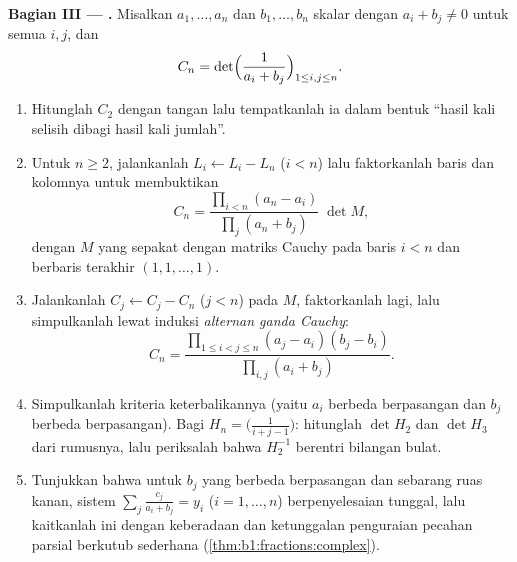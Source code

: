 \begin{problem}
\medskip
\noindent\textbf{Bagian III --- .} Misalkan $a_1,
\dots, a_n$ dan $b_1, \dots, b_n$ skalar dengan $a_i + b_j
\neq 0$ untuk semua $i, j$, dan
\[
C_n = \det\Bigl(\frac{1}{a_i + b_j}\Bigr)_{1 \leq i, j \leq n} .
\]
\begin{enumerate}[resume]
  \item Hitunglah $C_2$ dengan tangan lalu tempatkanlah ia dalam bentuk
        ``hasil kali selisih dibagi hasil kali jumlah''.
  \item Untuk $n \geq 2$, jalankanlah $L_i \leftarrow L_i - L_n$ ($i <
        n$) lalu faktorkanlah baris dan kolomnya untuk membuktikan
        \[
        C_n = \frac{\prod_{i<n}(a_n - a_i)}{\prod_{j}(a_n +
        b_j)}\;\det M,
        \]
        dengan $M$ yang sepakat dengan matriks Cauchy pada baris $i < n$
        dan berbaris terakhir $(1, 1, \dots, 1)$.
  \item Jalankanlah $C_j \leftarrow C_j - C_n$ ($j < n$) pada $M$,
        faktorkanlah lagi, lalu simpulkanlah lewat induksi
        \emph{alternan ganda Cauchy}:
        \[
        C_n = \frac{\prod_{1 \leq i < j \leq n}(a_j - a_i)(b_j -
        b_i)}{\prod_{i, j}(a_i + b_j)} .
        \]
  \item Simpulkanlah kriteria keterbalikannya (yaitu $a_i$ berbeda
        berpasangan dan $b_j$ berbeda berpasangan). Bagi
        \emph{} $H_n = \bigl(\frac{1}{i + j -
        1}\bigr)$: hitunglah $\det H_2$ dan $\det H_3$ dari
        rumusnya, lalu periksalah bahwa $H_2^{-1}$ berentri bilangan bulat.
  \item Tunjukkan bahwa untuk $b_j$ yang berbeda berpasangan dan sebarang ruas
        kanan, sistem $\sum_j \frac{c_j}{a_i + b_j} = y_i$
        ($i = 1, \dots, n$) berpenyelesaian tunggal, lalu kaitkanlah
        ini dengan keberadaan dan ketunggalan penguraian pecahan
        parsial berkutub sederhana
        (\cref{thm:b1:fractions:complex}).
\end{enumerate}


\end{problem}
